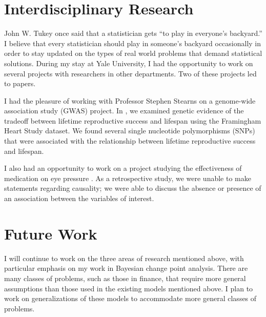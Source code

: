 \documentclass[11pt]{article}
\begin{document}
\section{Interdisciplinary Research} %
\label{sec:interdisciplinary_research}
  John W. Tukey once said that a statistician gets ``to play in everyone's backyard.'' I believe that every statistician should play in someone's backyard occasionally in order to stay updated on the types of real world problems that demand statistical solutions. During my stay at Yale University, I had the opportunity to work on several projects with researchers in other departments. Two of these projects led to papers.

  I had the pleasure of working with Professor Stephen Stearns on a genome-wide association study (GWAS) project. In \cite{wang2013genetic}, we examined genetic evidence of the tradeoff between lifetime reproductive success and lifespan using the Framingham Heart Study dataset. We found several single nucleotide polymorphisms (SNPs) that were associated with the relationship between lifetime reproductive success and lifespan.

  I also had an opportunity to work on a project studying the effectiveness of medication on eye pressure \cite{intraoc}. As a retrospective study, we were unable to make statements regarding causality; we were able to discuss the absence or presence of an association between the variables of interest.

\section{Future Work} %
\label{sec:future_work}
  I will continue to work on the three areas of research mentioned above, with particular emphasis on my work in Bayesian change point analysis. There are many classes of problems, such as those in finance, that require more general assumptions than those used in the existing models mentioned above. I plan to work on generalizations of these models to accommodate more general classes of problems. 
 

\end{document}
